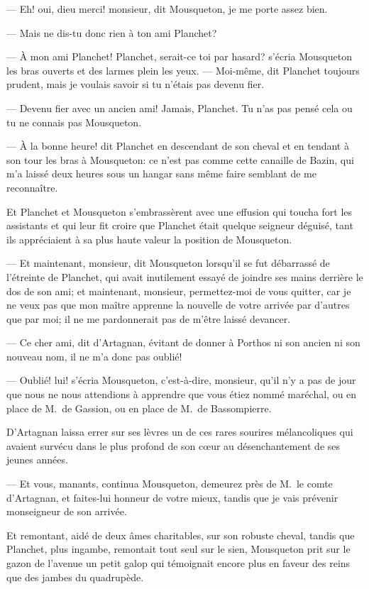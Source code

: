 — Eh! oui, dieu merci! monsieur, dit Mousqueton, je me porte assez bien.

— Mais ne dis-tu donc rien à ton ami Planchet?

— À mon ami Planchet! Planchet, serait-ce toi par hasard? s'écria Mousqueton les bras ouverts et des larmes plein les yeux.
— Moi-même, dit Planchet toujours prudent, mais je voulais savoir si tu n'étais pas devenu fier.

— Devenu fier avec un ancien ami! Jamais, Planchet. Tu n'as pas pensé cela ou tu ne connais pas Mousqueton.

— À la bonne heure! dit Planchet en descendant de son cheval et en tendant à son tour les bras à Mousqueton: ce n'est pas comme cette canaille de Bazin, qui m'a laissé deux heures sous un hangar sans même faire semblant de me reconnaître.

Et Planchet et Mousqueton s'embrassèrent avec une effusion qui toucha fort les assistants et qui leur fit croire que Planchet était quelque seigneur déguisé, tant ils appréciaient à sa plus haute valeur la position de Mousqueton.

— Et maintenant, monsieur, dit Mousqueton lorsqu'il se fut débarrassé de l'étreinte de Planchet, qui avait inutilement essayé de joindre ses mains derrière le dos de son ami; et maintenant, monsieur, permettez-moi de vous quitter, car je ne veux pas que mon maître apprenne la nouvelle de votre arrivée par d'autres que par moi; il ne me pardonnerait pas de m'être laissé devancer.

— Ce cher ami, dit d'Artagnan, évitant de donner à Porthos ni son ancien ni son nouveau nom, il ne m'a donc pas oublié!

— Oublié! lui! s'écria Mousqueton, c'est-à-dire, monsieur, qu'il n'y a pas de jour que nous ne nous attendions à apprendre que vous étiez nommé maréchal, ou en place de M.~de Gassion, ou en place de M.~de Bassompierre.

D'Artagnan laissa errer sur ses lèvres un de ces rares sourires mélancoliques qui avaient survécu dans le plus profond de son cœur au désenchantement de ses jeunes années.

— Et vous, manants, continua Mousqueton, demeurez près de M.~le comte d'Artagnan, et faites-lui honneur de votre mieux, tandis que je vais prévenir monseigneur de son arrivée.

Et remontant, aidé de deux âmes charitables, sur son robuste cheval, tandis que Planchet, plus ingambe, remontait tout seul sur le sien, Mousqueton prit sur le gazon de l'avenue un petit galop qui témoignait encore plus en faveur des reins que des jambes du quadrupède.

